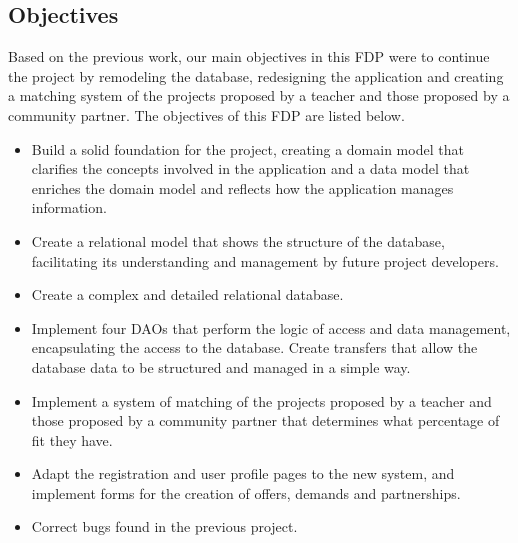 \documentclass[11pt]{book}
\begin{document}
\begin{itemize}
		\section{Objectives}
		Based on the previous work, our main objectives in this FDP were to continue the project by remodeling the database, redesigning the application and creating a matching system of the projects proposed by a teacher and those proposed by a community partner.
		The objectives of this FDP are listed below.
		\begin{itemize} 
			\item Build a solid foundation for the project, creating a domain model that clarifies the concepts involved in the application and a data model that enriches the domain model and reflects how the application manages information.
			\item Create a relational model that shows the structure of the database, facilitating its understanding and management by future project developers.
			\item Create a complex and detailed relational database.
			\item Implement four DAOs that perform the logic of access and data management, encapsulating the access to the database. Create transfers that allow the database data to be structured and managed in a simple way.
			\item Implement a system of matching of the projects proposed by a teacher and those proposed by a community partner that determines what percentage of fit they have.
			\item Adapt the registration and user profile pages to the new system, and implement forms for the creation of offers, demands and partnerships.
			\item Correct bugs found in the previous project.	
		\end{itemize}
		

\end{itemize}
\end{document}
